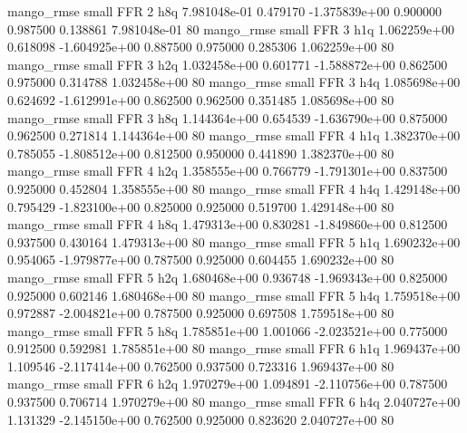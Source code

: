        mango_rmse      small      FFR                 2                  h8q 7.981048e-01      0.479170 -1.375839e+00 0.900000 0.987500       0.138861 7.981048e-01 80
       mango_rmse      small      FFR                 3                  h1q 1.062259e+00      0.618098 -1.604925e+00 0.887500 0.975000       0.285306 1.062259e+00 80
       mango_rmse      small      FFR                 3                  h2q 1.032458e+00      0.601771 -1.588872e+00 0.862500 0.975000       0.314788 1.032458e+00 80
       mango_rmse      small      FFR                 3                  h4q 1.085698e+00      0.624692 -1.612991e+00 0.862500 0.962500       0.351485 1.085698e+00 80
       mango_rmse      small      FFR                 3                  h8q 1.144364e+00      0.654539 -1.636790e+00 0.875000 0.962500       0.271814 1.144364e+00 80
       mango_rmse      small      FFR                 4                  h1q 1.382370e+00      0.785055 -1.808512e+00 0.812500 0.950000       0.441890 1.382370e+00 80
       mango_rmse      small      FFR                 4                  h2q 1.358555e+00      0.766779 -1.791301e+00 0.837500 0.925000       0.452804 1.358555e+00 80
       mango_rmse      small      FFR                 4                  h4q 1.429148e+00      0.795429 -1.823100e+00 0.825000 0.925000       0.519700 1.429148e+00 80
       mango_rmse      small      FFR                 4                  h8q 1.479313e+00      0.830281 -1.849860e+00 0.812500 0.937500       0.430164 1.479313e+00 80
       mango_rmse      small      FFR                 5                  h1q 1.690232e+00      0.954065 -1.979877e+00 0.787500 0.925000       0.604455 1.690232e+00 80
       mango_rmse      small      FFR                 5                  h2q 1.680468e+00      0.936748 -1.969343e+00 0.825000 0.925000       0.602146 1.680468e+00 80
       mango_rmse      small      FFR                 5                  h4q 1.759518e+00      0.972887 -2.004821e+00 0.787500 0.925000       0.697508 1.759518e+00 80
       mango_rmse      small      FFR                 5                  h8q 1.785851e+00      1.001066 -2.023521e+00 0.775000 0.912500       0.592981 1.785851e+00 80
       mango_rmse      small      FFR                 6                  h1q 1.969437e+00      1.109546 -2.117414e+00 0.762500 0.937500       0.723316 1.969437e+00 80
       mango_rmse      small      FFR                 6                  h2q 1.970279e+00      1.094891 -2.110756e+00 0.787500 0.937500       0.706714 1.970279e+00 80
       mango_rmse      small      FFR                 6                  h4q 2.040727e+00      1.131329 -2.145150e+00 0.762500 0.925000       0.823620 2.040727e+00 80
